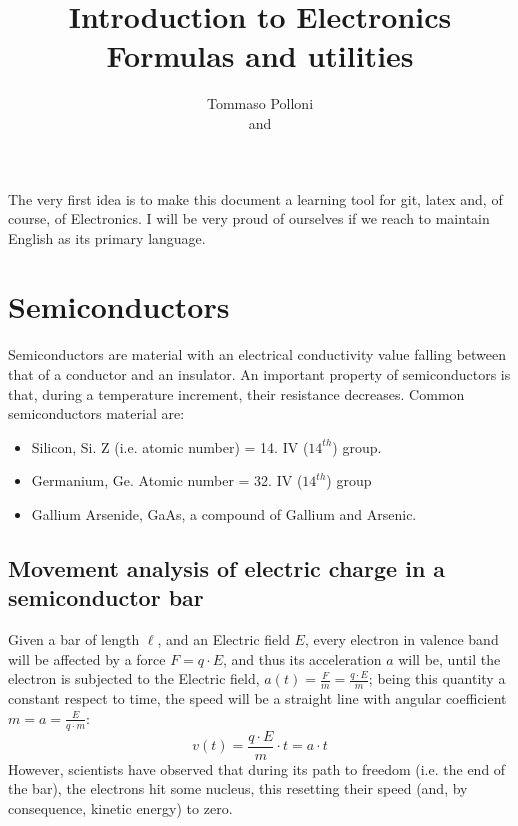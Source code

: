 \documentclass[12pt]{article}
\begin{document}
 
 
 
\title{Introduction to Electronics\\
Formulas and utilities}
\author{Tommaso Polloni\\
and }
 
 The very first idea is to make this document a learning tool for git, latex and, of course, of Electronics. I will be very proud of ourselves if we reach to maintain English as its primary language.
\maketitle
\tableofcontents

\section{Semiconductors} 
Semiconductors are material with an electrical conductivity value falling between that of a conductor and an insulator.
An important property of semiconductors is that, during a temperature increment, their resistance decreases.
Common semiconductors material are:
\begin{itemize}
	\item {}Silicon, Si. Z (i.e. atomic number) = 14. IV ($14^{th}$) group.
	\item Germanium, Ge. Atomic number = 32. IV ($14^{th}$) group
	\item Gallium Arsenide, GaAs, a compound of Gallium and Arsenic.
\end{itemize}

\subsection{Movement analysis of electric charge in a semiconductor bar}
Given a bar of length $\ell$, and an Electric field $E$, every electron in valence band will be affected by a force $F = q \cdot E$, and thus its acceleration $a$ will be, until the electron is subjected to the Electric field, $a(t)= \frac{F}{m} = \frac{q \cdot E}{m}$; being this quantity a constant respect to time, the speed will be a straight line with angular coefficient $m = a = \frac{E}{q \cdot m}$:
\begin{equation}
	v(t) = \frac{q \cdot E}{m} \cdot t = a \cdot t
\end{equation}
However, scientists have observed that during its path to freedom (i.e. the end of the bar), the electrons hit some nucleus, this resetting their speed (and, by consequence, kinetic energy) to zero. 
\end{document}
